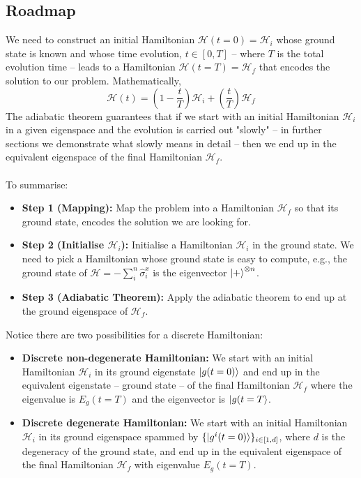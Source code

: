 \subsection{Roadmap}
We need to construct an initial Hamiltonian $\mathcal{H}(t=0) = \mathcal{H}_{i}$ whose ground state is known and whose time evolution, $t \in \left[0,T\right]$ -- where $T$ is the total evolution time -- leads to a Hamiltonian $\mathcal{H}(t=T) = \mathcal{H}_{f}$ that encodes the solution to our problem. Mathematically,
\begin{equation}
\label{eq:Htime}
    \mathcal{H}(t) = \left(1-\frac{t}{T}\right)\mathcal{H}_{i} + \left(\frac{t}{T} \right)\mathcal{H}_{f}
\end{equation}
The adiabatic theorem guarantees that if we start with an initial Hamiltonian $\mathcal{H}_{i}$ in a given eigenspace and the evolution is carried out "slowly" -- in further sections we demonstrate what slowly means in detail -- then we end up in the equivalent eigenspace of the final Hamiltonian $\mathcal{H}_{f}$. \\\\
To summarise:
\begin{itemize}
    \item \textbf{Step 1 (Mapping):} Map the problem into a Hamiltonian  $\mathcal{H}_{f}$ so that its ground state, encodes the solution we are looking for.
    \item \textbf{Step 2 (Initialise $\mathcal{H}_{i}$):} Initialise a Hamiltonian $\mathcal{H}_{i}$ in the ground state. We need to pick a Hamiltonian whose ground state is easy to compute, e.g., the ground state of $\mathcal{H} = - \sum_{i}^{n}\hat{\sigma}_{i}^{x}$ is the eigenvector $\ket{+}^{\otimes n}$.
    \item \textbf{Step 3 (Adiabatic Theorem):} Apply the adiabatic theorem to end up at the ground eigenspace of $\mathcal{H}_{f}$.
\end{itemize}
Notice there are two possibilities for a discrete Hamiltonian:
\begin{itemize}
    \item \textbf{Discrete non-degenerate Hamiltonian:} We start with an initial Hamiltonian $\mathcal{H}_{i}$ in its ground eigenstate $\ket{g(t=0)}$ and end up in the equivalent eigenstate -- ground state -- of the final Hamiltonian $\mathcal{H}_{f}$ where the eigenvalue is $E_{g}(t=T)$ and the eigenvector is $\ket{g(t=T}$.
    \item \textbf{Discrete degenerate Hamiltonian:} We start with an initial Hamiltonian $\mathcal{H}_{i}$ in its ground eigenspace spammed by $\{\ket{g^{i}(t=0)}\}_{i \in \left[1,d\right]}$, where $d$ is the degeneracy of the ground state, and end up in the equivalent eigenspace of the final Hamiltonian $\mathcal{H}_{f}$ with eigenvalue $E_{g}(t=T)$.
\end{itemize}
